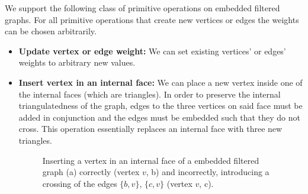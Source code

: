 We support the following class of primitive operations on embedded filtered graphs. For all primitive operations that create new vertices or edges the weights can be chosen arbitrarily.
%
\begin{itemize}
	\item \textbf{Update vertex or edge weight:} We can set existing vertices' or edges' weights to arbitrary new values.

	\item \textbf{Insert vertex in an internal face:} We can place a new vertex inside one of the internal faces (which are triangles). In order to preserve the internal triangulatedness of the graph, edges to the three vertices on said face must be added in conjunction and the edges must be embedded such that they do not cross. This operation essentially replaces an internal face with three new triangles.
\begin{figure}[H]
	\centering
	\quad
	\quad
	\caption{Inserting a vertex in an internal face of a embedded filtered graph (a) correctly (vertex $v$, b) and incorrectly, introducing a crossing of the edges $\{b,v\}$, $\{c,v\}$ (vertex $v$, c).}
	\label{fig:transformation}
\end{figure}


\end{itemize}
